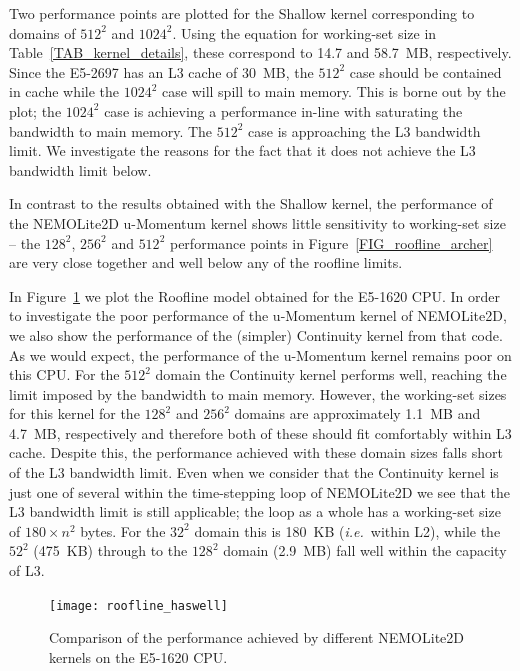 \documentclass[12pt]{article}
\begin{document}
Two performance points are plotted for the Shallow kernel
corresponding to domains of $512^2$ and $1024^2$. Using the equation
for working-set size in Table~\ref{TAB_kernel_details}, these
correspond to 14.7 and 58.7~MB, respectively. Since the E5-2697 has
an L3 cache of 30~MB, the $512^2$ case should be contained in cache
while the $1024^2$ case will spill to main memory. This is borne out
by the plot; the $1024^2$ case is achieving a performance in-line
with saturating the bandwidth to main memory. The $512^2$ case is
approaching the L3 bandwidth limit. We investigate the reasons for
the fact that it does not achieve the L3 bandwidth limit below.
 
In contrast to the results obtained with the Shallow kernel, the
performance of the NEMOLite2D u-Momentum kernel shows little
sensitivity to working-set size -- the $128^2$, $256^2$ and $512^2$
performance points in Figure~\ref{FIG_roofline_archer} are very close
together and well below any of the roofline limits.

In Figure~\ref{FIG_roofline_haswell} we plot the Roofline model
obtained for the E5-1620 CPU. In order to investigate the poor
performance of the u-Momentum kernel of NEMOLite2D, we also show the
performance of the (simpler) Continuity kernel from that code. As we
would expect, the performance of the u-Momentum kernel remains poor on
this CPU. For the $512^2$ domain the Continuity kernel performs well,
reaching the limit imposed by the bandwidth to main memory. However,
the working-set sizes for this kernel for the $128^2$ and $256^2$
domains are approximately 1.1~MB and 4.7~MB, respectively and
therefore both of these should fit comfortably within L3
cache. Despite this, the performance achieved with these domain sizes
falls short of the L3 bandwidth limit.  Even when we consider that the
Continuity kernel is just one of several within the time-stepping loop
of NEMOLite2D we see that the L3 bandwidth limit is still applicable;
the loop as a whole has a working-set size of $180\times n^{2}$
bytes. For the $32^2$ domain this is 180~KB ({\it i.e.}\ within L2),
while the $52^2$ (475~KB) through to the $128^2$ domain (2.9~MB) fall
well within the capacity of L3.

\begin{figure}
\centering
\texttt{[image: roofline\_haswell]}
\caption{Comparison of the performance achieved by different
  NEMOLite2D kernels on the E5-1620 CPU.}
\label{FIG_roofline_haswell}
\end{figure}
\end{document}
